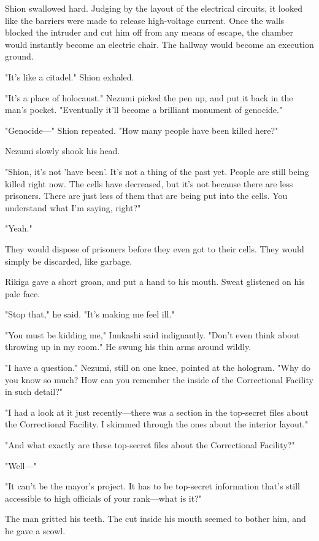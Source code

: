 Shion swallowed hard. Judging by the layout of the electrical circuits,
it looked like the barriers were made to release high-voltage current.
Once the walls blocked the intruder and cut him off from any means of
escape, the chamber would instantly become an electric chair. The
hallway would become an execution ground.

"It's like a citadel." Shion exhaled.

"It's a place of holocaust." Nezumi picked the pen up, and put it back
in the man's pocket. "Eventually it'll become a brilliant monument of
genocide."

"Genocide---" Shion repeated. "How many people have been killed here?"

Nezumi slowly shook his head.

"Shion, it's not 'have been'. It's not a thing of the past yet. People
are still being killed right now. The cells have decreased, but it's not
because there are less prisoners. There are just less of them that are
being put into the cells. You understand what I'm saying, right?"

"Yeah."

They would dispose of prisoners before they even got to their cells.
They would simply be discarded, like garbage.

Rikiga gave a short groan, and put a hand to his mouth. Sweat glistened
on his pale face.

"Stop that," he said. "It's making me feel ill."

"You must be kidding me," Inukashi said indignantly. "Don't even think
about throwing up in my room." He swung his thin arms around wildly.

"I have a question." Nezumi, still on one knee, pointed at the hologram.
"Why do you know so much? How can you remember the inside of the
Correctional Facility in such detail?"

"I had a look at it just recently---there was a section in the top-secret
files about the Correctional Facility. I skimmed through the ones about
the interior layout."

"And what exactly are these top-secret files about the Correctional
Facility?"

"Well---"

"It can't be the mayor's project. It has to be top-secret information
that's still accessible to high officials of your rank---what is it?"

The man gritted his teeth. The cut inside his mouth seemed to bother
him, and he gave a scowl.

